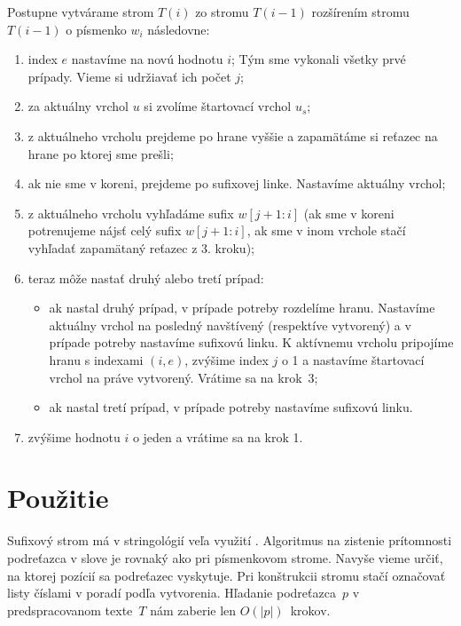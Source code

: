 Postupne vytvárame strom $T(i)$ zo stromu $T(i-1)$ rozšírením stromu 
$T(i-1)$ o písmenko $w_i$ následovne:

\newpage
\begin{enumerate}
\item index $e$ nastavíme na novú hodnotu $i$; 
Tým sme vykonali všetky prvé prípady. Vieme si udržiavať ich počet $j$;
\item za aktuálny vrchol $u$ si zvolíme štartovací vrchol $u_s$;
\item z aktuálneho vrcholu prejdeme po hrane vyššie a zapamätáme si reťazec 
na hrane po ktorej sme prešli;
\item ak nie sme v koreni, prejdeme po sufixovej linke. Nastavíme aktuálny 
vrchol;
\item z aktuálneho vrcholu vyhľadáme sufix $w[j+1:i]$ (ak sme v koreni 
potrenujeme nájsť celý sufix $w[j+1:i]$, ak sme v inom vrchole stačí 
vyhľadať zapamätaný reťazec z 3. kroku);
\item teraz môže nastať druhý alebo tretí prípad:
\begin{itemize}
\item ak nastal druhý prípad, v prípade potreby rozdelíme hranu. Nastavíme 
aktuálny vrchol na posledný navštívený (respektíve vytvorený) a v prípade 
potreby nastavíme sufixovú linku. K aktívnemu vrcholu pripojíme hranu s 
indexami $(i,e)$, zvýšime index $j$ o 1 a nastavíme štartovací vrchol na 
práve vytvorený. Vrátime sa na krok~3;
\item ak nastal tretí prípad, v prípade potreby nastavíme sufixovú linku.
\end{itemize}
\item zvýšime hodnotu $i$ o jeden a vrátime sa na krok 1.
\end{enumerate}
 

\section{Použitie}\label{sec:sx:usage}

Sufixový strom má v stringológií veľa využití \citep{gusfield}. Algoritmus na 
zistenie prítomnosti podreťazca v slove je rovnaký ako pri písmenkovom strome. 
Navyše vieme určiť, na ktorej pozícií sa podreťazec vyskytuje. Pri 
konštrukcii stromu stačí označovať listy číslami v poradí podľa vytvorenia. 
Hľadanie podreťazca~$p$ v predspracovanom texte~$T$ nám zaberie len 
$O(|p|)$~krokov.

